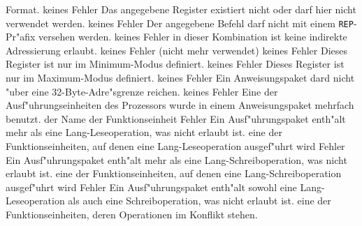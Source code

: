 \documentclass[12pt,a4paper,twoside]{report}
\newcommand{\tty}[1]{{\tt #1}}
\begin{document}
\begin{description}
{                Format.}
               {keines}
               {Fehler}
               {Das angegebene Register existiert nicht oder
                darf hier nicht verwendet werden.}
               {keines}
               {Fehler}
               {Der angegebene Befehl darf nicht mit einem
                \tty{REP}-Pr"afix versehen werden.}
               {keines}
               {Fehler}
               {in dieser Kombination ist keine indirekte
                Adressierung erlaubt.}
               {keines}
               {Fehler}
               {(nicht mehr verwendet)}
               {keines}
               {Fehler}
               {Dieses Register ist nur im Minimum-Modus
                definiert.}
               {keines}
               {Fehler}
               {Dieses Register ist nur im Maximum-Modus
                definiert.}
               {keines}
               {Fehler}
               {Ein Anweisungspaket dard nicht "uber eine
                32-Byte-Adre"sgrenze reichen.}
               {keines}
               {Fehler}
               {Eine der Ausf"uhrungseinheiten des Prozessors wurde in
                einem Anweisungspaket mehrfach benutzt.}
               {der Name der Funktionseinheit}
               {Fehler}
               {Ein Ausf"uhrungspaket enth"alt mehr als eine
                Lang-Leseoperation, was nicht erlaubt ist.}
               {eine der Funktionseinheiten, auf denen eine
                Lang-Leseoperation ausgef"uhrt wird}
               {Fehler}
               {Ein Ausf"uhrungspaket enth"alt mehr als eine
                Lang-Schreiboperation, was nicht erlaubt ist.}
               {eine der Funktionseinheiten, auf denen eine
                Lang-Schreiboperation ausgef"uhrt wird}
               {Fehler}
               {Ein Ausf"uhrungspaket enth"alt sowohl eine
                Lang-Leseoperation als auch eine Schreiboperation,
                was nicht erlaubt ist.}
               {eine der Funktionseinheiten, deren Operationen im
                Konflikt stehen.}

\end{description}
\end{document}
